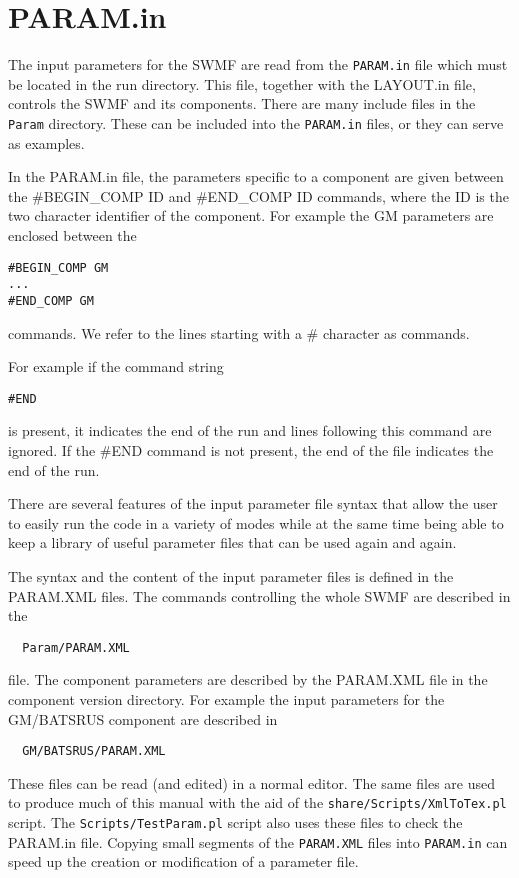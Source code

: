 %

\section{PARAM.in \label{section:param.in}}

The input parameters for the SWMF are read from the 
{\tt PARAM.in} file which must be located in the run directory.
This file, together with the LAYOUT.in file, controls the SWMF
and its components.
There are many include files in the {\tt Param} directory. These
can be included into the {\tt PARAM.in} files, or they can serve as
examples. 

In the PARAM.in file, 
the parameters specific to a component are given between
the \#BEGIN\_COMP ID and \#END\_COMP ID commands,
where the ID is the two character identifier of the component.
For example the GM parameters are enclosed between the 
\begin{verbatim}
#BEGIN_COMP GM
...
#END_COMP GM
\end{verbatim}
commands. We refer to the lines starting with a \# character as commands.

For example if the command string 
\begin{verbatim}
#END
\end{verbatim}
is present, it indicates the end of the run and lines following
this command are ignored. If the \#END command is not
present, the end of the file indicates the end of the run.

There are several features of the input parameter file syntax
that allow the user to easily run the code
in a variety of modes while at the same time being able to 
keep a library of useful parameter files that can be used
again and again.

The syntax and the content of the input parameter files
is defined in the PARAM.XML files. The commands controlling
the whole SWMF are described in the 
\begin{verbatim}
  Param/PARAM.XML
\end{verbatim}
file. The component parameters are described by the PARAM.XML
file in the component version directory. For example the
input parameters for the GM/BATSRUS component are described in
\begin{verbatim}
  GM/BATSRUS/PARAM.XML
\end{verbatim}
These files can be read (and edited) in a normal editor.
The same files are used to produce much of this
manual with the aid of the {\tt share/Scripts/XmlToTex.pl} script. 
The {\tt Scripts/TestParam.pl} script also uses these files
to check the PARAM.in file.
Copying small segments of the {\tt PARAM.XML} files
into {\tt PARAM.in} can speed up the creation or modification of a 
parameter file. 

